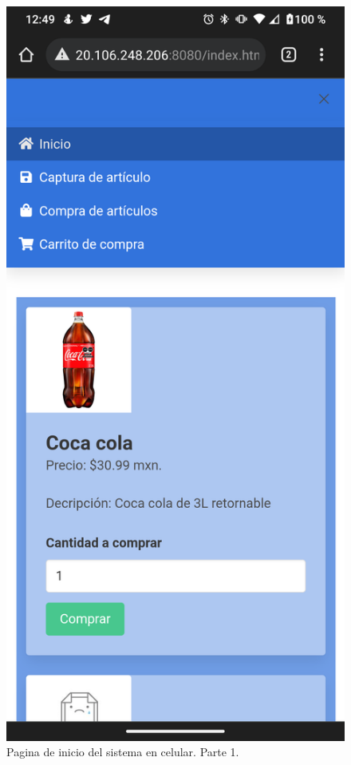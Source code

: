 \documentclass[11pt]{article}
\begin{document}
		\begin{figure}[H]
			\centering
			\includegraphics[scale=0.27]{resources/Screenshot_20211113-004941.png}
			\caption{Pagina de inicio del sistema en celular. Parte 1.}\label{fig:picture}
		\end{figure}
\end{document}
